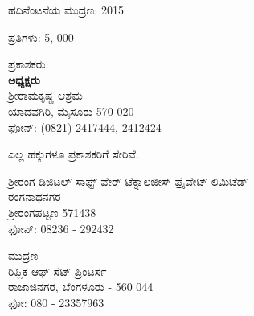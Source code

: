 

\begin{flushleft}
ಹದಿನೆಂಟನೆಯ ಮುದ್ರಣ: 2015
\end{flushleft}

\vfill

\begin{flushleft}
ಪ್ರತಿಗಳು: 5, 000
\end{flushleft}

\vfill

\begin{flushleft}
ಪ್ರಕಾಶಕರು:\\\textbf{ಅಧ್ಯಕ್ಷರು}\\ಶ‍್ರೀರಾಮಕೃಷ್ಣ ಆಶ್ರಮ\\ಯಾದವಗಿರಿ, ಮೈಸೂರು 570 020\\ಫೋನ್​: (0821) 2417444, 2412424
\end{flushleft}

\vfill

\begin{flushleft}
 ಎಲ್ಲ ಹಕ್ಕುಗಳೂ ಪ್ರಕಾಶಕರಿಗೆ ಸೇರಿವೆ.
\end{flushleft}

\vfill

\begin{flushleft}
ಶ‍್ರೀರಂಗ ಡಿಜಿಟಲ್ ಸಾಫ್ಟ್ ‍ವೇರ್ ಟೆಕ್ನಾಲಜೀಸ್ ಪ್ರೈವೇಟ್ ಲಿಮಿಟೆಡ್\\ರಂಗನಾಥನಗರ\\ಶ‍್ರೀರಂಗಪಟ್ಟಣ 571438\\ಫೋನ್​: 08236 - 292432
\end{flushleft}

\vfill

\begin{flushleft}
ಮುದ್ರಣ\\ರಿಪ್ಲಿಕ ಆಫ್ ಸೆಟ್ ಪ್ರಿಂಟರ್ಸ\\ರಾಜಾಜಿನಗರ, ಬೆಂಗಳೂರು - 560 044\\ಫೋ: 080 - 23357963
\end{flushleft}

